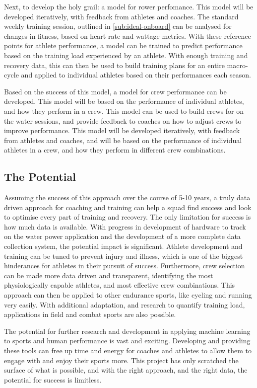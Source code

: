Next, to develop the holy grail: a model for rower perfomance. This model will be developed iteratively, with feedback from athletes and coaches. The standard weekly training session, outlined in \autoref{sub:ideal-onboard} can be analysed for changes in fitness, based on heart rate and wattage metrics. With these reference points for athlete performance, a model can be trained to predict performance based on the training load experienced by an athlete. With enough training and recovery data, this can then be used to build training plans for an entire macro-cycle and applied to individual athletes based on their performances each season. 

Based on the success of this model, a model for crew performance can be developed. This model will be based on the performance of individual athletes, and how they perform in a crew. This model can be used to build crews for on the water sessions, and provide feedback to coaches on how to adjust crews to improve performance. This model will be developed iteratively, with feedback from athletes and coaches, and will be based on the performance of individual athletes in a crew, and how they perform in different crew combinations.

\subsection{The Potential}
Assuming the success of this approach over the course of 5-10 years, a truly data driven approach for coaching and training can help a squad find success and look to optimise every part of training and recovery. The only limitation for success is how much data is available. With progress in development of hardware to track on the water power application and the development of a more complete data collection system, the potential impact is significant. Athlete development and training can be tuned to prevent injury and illness, which is one of the biggest hinderances for athletes in their pursuit of success. Furthermore, crew selection can be made more data driven and transparent, identifying the most physiologically capable athletes, and most effective crew combinations. This approach can then be applied to other endurance sports, like cycling and running very easily. With additional adaptation, and research to quantify training load, applications in field and combat sports are also possible.

The potential for further research and development in applying machine learning to sports and human performance is vast and exciting. Developing and providing these tools can free up time and energy for coaches and athletes to allow them to engage with and enjoy their sports more. This project has only scratched the surface of what is possible, and with the right approach, and the right data, the potential for success is limitless.